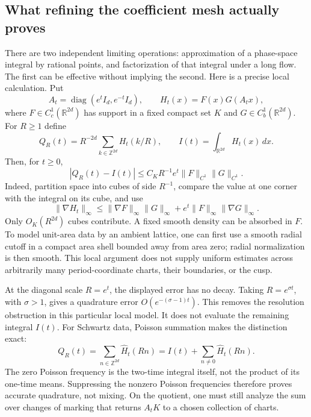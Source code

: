 \documentclass[11pt,a4paper]{article}
\numberwithin{equation}{section}
\theoremstyle{definition}
\theoremstyle{remark}
\begin{document}
\subsection{What refining the coefficient mesh actually proves}

There are two independent limiting operations: approximation of a phase-space
integral by rational points, and factorization of that integral under a long
flow.  The first can be effective without implying the second.
Here is a precise local calculation.  Put
\[
 A_t=\operatorname{diag}(e^t I_d,e^{-t}I_d),\qquad
 H_t(x)=F(x)G(A_tx),
\]
where $F\in C_c^1(\mathbb R^{2d})$ has support in a fixed compact set $K$ and
$G\in C_b^1(\mathbb R^{2d})$.  For $R\geq1$ define
\[
 Q_R(t)=R^{-2d}\sum_{k\in\mathbb Z^{2d}}H_t(k/R),\qquad
 I(t)=\int_{\mathbb R^{2d}}H_t(x)\,dx.
\]
Then, for $t\geq0$,
\begin{equation}\label{eq:pairquadrature}
 |Q_R(t)-I(t)|\leq C_K R^{-1}e^t
       \|F\|_{C^1}\|G\|_{C^1}.
\end{equation}
Indeed, partition space into cubes of side $R^{-1}$, compare the value at one
corner with the integral on its cube, and use
\[
 \|\nabla H_t\|_\infty
 \leq \|\nabla F\|_\infty\|G\|_\infty
       +e^t\|F\|_\infty\|\nabla G\|_\infty.
\]
Only $O_K(R^{2d})$ cubes contribute.  A fixed smooth density can be absorbed
in $F$.  To model unit-area data by an ambient lattice, one can first use a
smooth radial cutoff in a compact area shell bounded away from area zero;
radial normalization is then smooth.  This local argument does not supply
uniform estimates across arbitrarily many period-coordinate charts, their
boundaries, or the cusp.

At the diagonal scale $R=e^t$, the displayed error has no decay.
Taking $R=e^{\sigma t}$, with $\sigma>1$, gives a quadrature error
$O(e^{-(\sigma-1)t})$.  This removes the resolution obstruction in this
particular local model.  It does not evaluate the remaining integral $I(t)$.
For Schwartz data, Poisson summation makes the distinction exact:
\begin{equation}\label{eq:pairpoissonzero}
 Q_R(t)=\sum_{n\in\mathbb Z^{2d}}\widehat H_t(Rn)
       =I(t)+\sum_{n\ne0}\widehat H_t(Rn).
\end{equation}
The zero Poisson frequency is the two-time integral itself, not the product
of its one-time means.  Suppressing the nonzero Poisson frequencies therefore
proves accurate quadrature, not mixing.  On the quotient, one must still
analyze the sum over changes of marking that returns $A_tK$ to a chosen
collection of charts.
\end{document}
